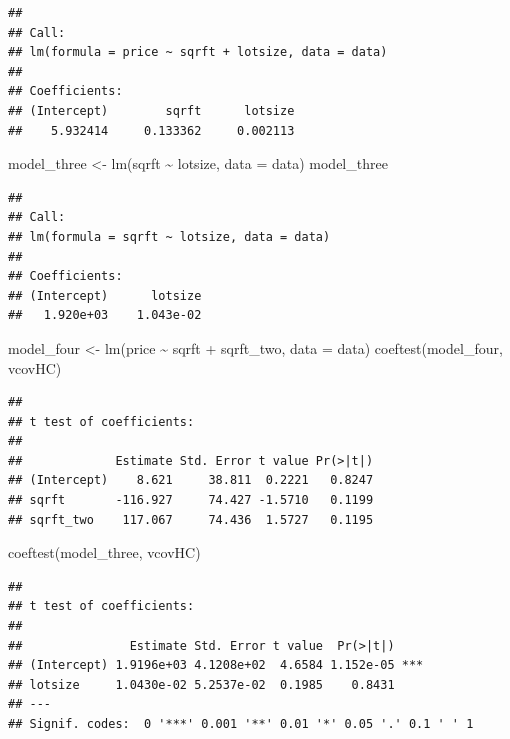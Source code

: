 \documentclass[
]{book}
\newenvironment{Shaded}{\begin{snugshade}}{\end{snugshade}}
\newcommand{\AttributeTok}[1]{\textcolor[rgb]{0.77,0.63,0.00}{#1}}
\newcommand{\FunctionTok}[1]{\textcolor[rgb]{0.00,0.00,0.00}{#1}}
\newcommand{\NormalTok}[1]{#1}
\newcommand{\OtherTok}[1]{\textcolor[rgb]{0.56,0.35,0.01}{#1}}
\newcommand{\SpecialCharTok}[1]{\textcolor[rgb]{0.00,0.00,0.00}{#1}}
\theoremstyle{definition}
\theoremstyle{definition}
\theoremstyle{definition}
\theoremstyle{definition}
\theoremstyle{remark}
\begin{document}
\begin{verbatim}
## 
## Call:
## lm(formula = price ~ sqrft + lotsize, data = data)
## 
## Coefficients:
## (Intercept)        sqrft      lotsize  
##    5.932414     0.133362     0.002113
\end{verbatim}

\begin{Shaded}
\begin{Highlighting}[]
\NormalTok{model\_three }\OtherTok{\textless{}{-}} \FunctionTok{lm}\NormalTok{(sqrft }\SpecialCharTok{\textasciitilde{}}\NormalTok{ lotsize, }\AttributeTok{data =}\NormalTok{ data)}
\NormalTok{model\_three}
\end{Highlighting}
\end{Shaded}

\begin{verbatim}
## 
## Call:
## lm(formula = sqrft ~ lotsize, data = data)
## 
## Coefficients:
## (Intercept)      lotsize  
##   1.920e+03    1.043e-02
\end{verbatim}

\begin{Shaded}
\begin{Highlighting}[]
\NormalTok{model\_four }\OtherTok{\textless{}{-}} \FunctionTok{lm}\NormalTok{(price }\SpecialCharTok{\textasciitilde{}}\NormalTok{ sqrft }\SpecialCharTok{+}\NormalTok{ sqrft\_two, }\AttributeTok{data =}\NormalTok{ data)}
\FunctionTok{coeftest}\NormalTok{(model\_four, vcovHC)}
\end{Highlighting}
\end{Shaded}

\begin{verbatim}
## 
## t test of coefficients:
## 
##             Estimate Std. Error t value Pr(>|t|)
## (Intercept)    8.621     38.811  0.2221   0.8247
## sqrft       -116.927     74.427 -1.5710   0.1199
## sqrft_two    117.067     74.436  1.5727   0.1195
\end{verbatim}

\begin{Shaded}
\begin{Highlighting}[]
\FunctionTok{coeftest}\NormalTok{(model\_three, vcovHC)}
\end{Highlighting}
\end{Shaded}

\begin{verbatim}
## 
## t test of coefficients:
## 
##               Estimate Std. Error t value  Pr(>|t|)    
## (Intercept) 1.9196e+03 4.1208e+02  4.6584 1.152e-05 ***
## lotsize     1.0430e-02 5.2537e-02  0.1985    0.8431    
## ---
## Signif. codes:  0 '***' 0.001 '**' 0.01 '*' 0.05 '.' 0.1 ' ' 1
\end{verbatim}
\end{document}
